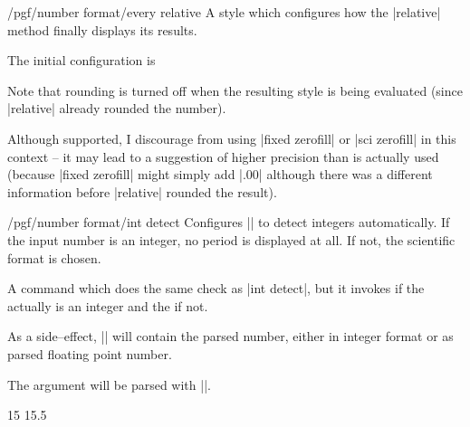\begin{stylekey}{/pgf/number format/every relative}
	A style which configures how the |relative| method finally displays its results.

	The initial configuration is
\begin{codeexample}
\end{codeexample}

	Note that rounding is turned off when the resulting style is being evaluated (since |relative| already rounded the number).

	Although supported, I discourage from using |fixed zerofill| or |sci zerofill| in this context -- it may lead to a suggestion of higher precision than is actually used (because |fixed zerofill| might simply add |.00| although there was a different information before |relative| rounded the result).
\end{stylekey}

\begin{key}{/pgf/number format/int detect}
Configures |\pgfmathprintnumber| to detect integers automatically. If the input number is an integer, no period is displayed at all. If not, the scientific format is chosen.

\begin{codeexample}[]
\hspace{1em}
\hspace{1em}
\hspace{1em}
\hspace{1em}
\end{codeexample}
\end{key}

\begin{command}{\pgfmathifisint{}}
	A command which does the same check as |int detect|, but it invokes  if the  actually is an integer and the  if not.

	As a side--effect, |\pgfretval| will contain the parsed number, either in integer format or as parsed floating point number.

	The argument  will be parsed with |\pgfmathfloatparsenumber|. 
\begin{codeexample}[]
15 \hspace{1em}
15.5 
\end{codeexample}
\end{command}

